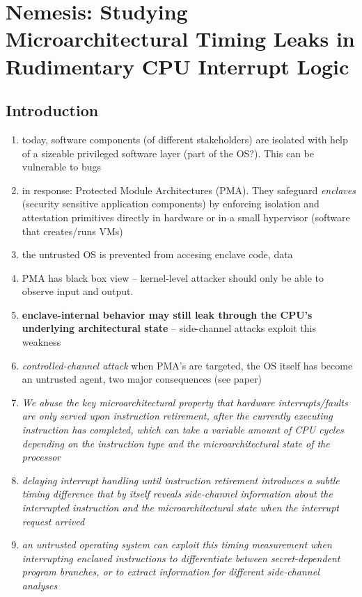 \documentclass{article}
\begin{document}
\section{Nemesis: Studying Microarchitectural Timing Leaks in Rudimentary CPU Interrupt Logic}
\subsection{Introduction}
\begin{enumerate}
\item today, software components (of different stakeholders) are isolated with help of a sizeable privileged software layer (part of the OS?). This can be vulnerable to bugs
\item in response: Protected Module Architectures (PMA). They safeguard \textit{enclaves} (security sensitive application components) by enforcing isolation and attestation primitives directly in hardware or in a small hypervisor (software that creates/runs VMs)
\item the untrusted OS is prevented from accesing enclave code, data
\item PMA has black box view -- kernel-level attacker should only be able to observe input and output. 
\item \textbf{enclave-internal behavior may still leak through the CPU's underlying architectural state} -- side-channel attacks exploit this weakness
\item \textit{controlled-channel attack} when PMA's are targeted, the OS itself has become an untrusted agent, two major consequences (see paper)
\item \textit{We abuse the key microarchitectural property that hardware interrupts/faults are only served upon instruction retirement, after the currently
executing instruction has completed, which can take a variable amount of CPU cycles depending on the instruction type and the microarchitectural state of the processor}
\item \textit{delaying interrupt handling until instruction retirement introduces a subtle timing difference that by itself reveals side-channel information
about the interrupted instruction and the microarchitectural state when the interrupt request arrived}
\item \textit{an untrusted operating system can exploit this timing measurement when interrupting
enclaved instructions to differentiate between secret-dependent program branches, or to extract information for different side-channel analyses}
\end{enumerate}
\end{document}
